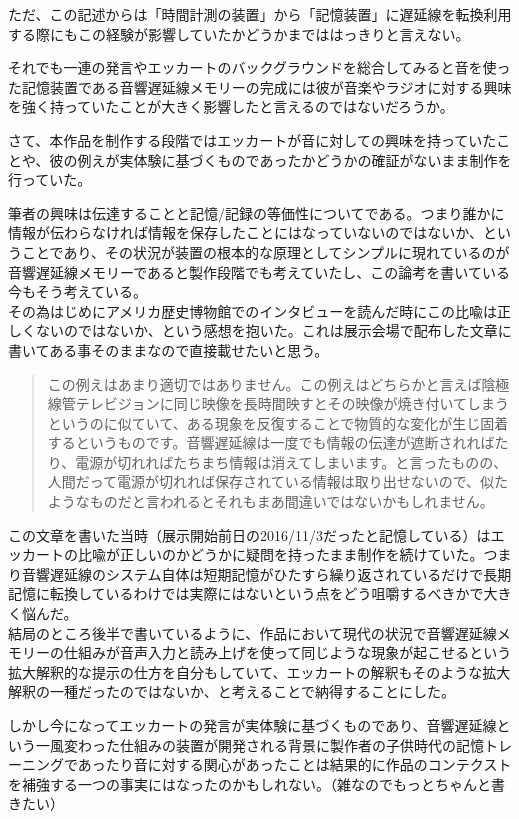 ただ、この記述からは「時間計測の装置」から「記憶装置」に遅延線を転換利用する際にもこの経験が影響していたかどうかまでははっきりと言えない。

それでも一連の発言やエッカートのバックグラウンドを総合してみると音を使った記憶装置である音響遅延線メモリーの完成には彼が音楽やラジオに対する興味を強く持っていたことが大きく影響したと言えるのではないだろうか。

さて、本作品を制作する段階ではエッカートが音に対しての興味を持っていたことや、彼の例えが実体験に基づくものであったかどうかの確証がないまま制作を行っていた。

筆者の興味は伝達することと記憶/記録の等価性についてである。つまり誰かに情報が伝わらなければ情報を保存したことにはなっていないのではないか、ということであり、その状況が装置の根本的な原理としてシンプルに現れているのが音響遅延線メモリーであると製作段階でも考えていたし、この論考を書いている今もそう考えている。\\
その為はじめにアメリカ歴史博物館でのインタビューを読んだ時にこの比喩は正しくないのではないか、という感想を抱いた。これは展示会場で配布した文章に書いてある事そのままなので直接載せたいと思う。

\begin{quote}
この例えはあまり適切ではありません。この例えはどちらかと言えば陰極線管テレビジョンに同じ映像を長時間映すとその映像が焼き付いてしまうというのに似ていて、ある現象を反復することで物質的な変化が生じ固着するというものです。音響遅延線は一度でも情報の伝達が遮断されればたり、電源が切れればたちまち情報は消えてしまいます。と言ったものの、人間だって電源が切れれば保存されている情報は取り出せないので、似たようなものだと言われるとそれもまあ間違いではないかもしれません。
\end{quote}

この文章を書いた当時（展示開始前日の2016/11/3だったと記憶している）はエッカートの比喩が正しいのかどうかに疑問を持ったまま制作を続けていた。つまり音響遅延線のシステム自体は短期記憶がひたすら繰り返されているだけで長期記憶に転換しているわけでは実際にはないという点をどう咀嚼するべきかで大きく悩んだ。\\
結局のところ後半で書いているように、作品において現代の状況で音響遅延線メモリーの仕組みが音声入力と読み上げを使って同じような現象が起こせるという拡大解釈的な提示の仕方を自分もしていて、エッカートの解釈もそのような拡大解釈の一種だったのではないか、と考えることで納得することにした。

しかし今になってエッカートの発言が実体験に基づくものであり、音響遅延線という一風変わった仕組みの装置が開発される背景に製作者の子供時代の記憶トレーニングであったり音に対する関心があったことは結果的に作品のコンテクストを補強する一つの事実にはなったのかもしれない。（雑なのでもっとちゃんと書きたい）

